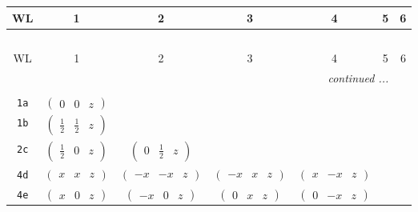 \documentclass[fleqn,9pt,landscape]{jsarticle}
\begin{document}
\begin{center}
\renewcommand{\arraystretch}{1.2}
\begin{longtable}{ccccccc}
 \hline \hline
WL & 1 & 2 & 3 & 4 & 5 & 6 \\ \hline \endfirsthead

\multicolumn{6}{l}{\tablename\ \thetable{}} \\
 \hline \hline
WL & 1 & 2 & 3 & 4 & 5 & 6 \\ \hline \endhead

 \hline \hline
\multicolumn{6}{r}{\footnotesize\it continued ...} \\ \endfoot

 \hline \hline
\multicolumn{6}{r}{} \\ \endlastfoot

{\tt 1a} & $ \begin{pmatrix} 0 & 0 & z \end{pmatrix} $ & $  $ & $  $ & $  $ & $  $ & $  $ \\ \hline
{\tt 1b} & $ \begin{pmatrix} \frac{1}{2} & \frac{1}{2} & z \end{pmatrix} $ & $  $ & $  $ & $  $ & $  $ & $  $ \\ \hline
{\tt 2c} & $ \begin{pmatrix} \frac{1}{2} & 0 & z \end{pmatrix} $ & $ \begin{pmatrix} 0 & \frac{1}{2} & z \end{pmatrix} $ & $  $ & $  $ & $  $ & $  $ \\ \hline
{\tt 4d} & $ \begin{pmatrix} x & x & z \end{pmatrix} $ & $ \begin{pmatrix} - x & - x & z \end{pmatrix} $ & $ \begin{pmatrix} - x & x & z \end{pmatrix} $ & $ \begin{pmatrix} x & - x & z \end{pmatrix} $ & $  $ & $  $ \\ \hline
{\tt 4e} & $ \begin{pmatrix} x & 0 & z \end{pmatrix} $ & $ \begin{pmatrix} - x & 0 & z \end{pmatrix} $ & $ \begin{pmatrix} 0 & x & z \end{pmatrix} $ & $ \begin{pmatrix} 0 & - x & z \end{pmatrix} $ & $  $ & $  $ \\ \hline

\end{longtable}
\end{center}
\end{document}
